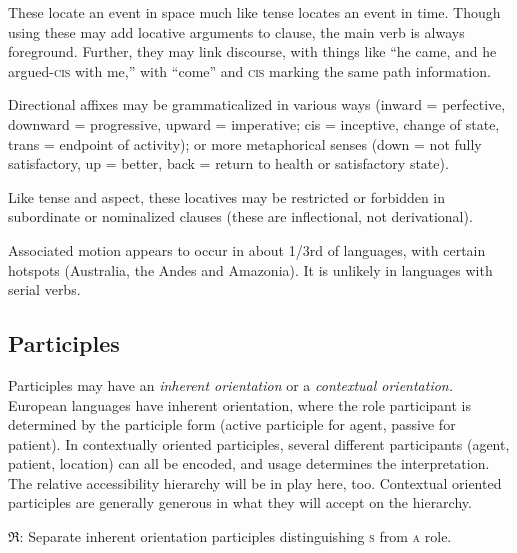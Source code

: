\documentclass[11pt]{article}
\newcommand{\I}[1]{\textsc{#1}}   %
\newcommand{\rara}[1]{$\mathfrak{R}$: #1}
\begin{document}
These locate an event in space much like tense locates an event in
time.  Though using these may add locative arguments to clause, the
main verb is always foreground.  Further, they may link discourse,
with things like ``he came, and he argued-\I{cis} with me,'' with
``come'' and \I{cis} marking the same path information.

Directional affixes may be grammaticalized in various ways (inward =
perfective, downward = progressive, upward = imperative; cis =
inceptive, change of state, trans = endpoint of activity); or more
metaphorical senses (down = not fully satisfactory, up = better, back
= return to health or satisfactory state).

Like tense and aspect, these locatives may be restricted or forbidden
in subordinate or nominalized clauses (these are inflectional, not
derivational). 

Associated motion appears to occur in about 1/3rd of languages, with
certain hotspots (Australia, the Andes and Amazonia).  It is unlikely
in languages with serial verbs.


\subsection{Participles}
Participles may have an \textit{inherent orientation} or a
\textit{contextual orientation.}  European languages have inherent
orientation, where the role participant is determined by the
participle form (active participle for agent, passive for patient).
In contextually oriented participles, several different participants
(agent, patient, location) can all be encoded, and usage determines
the interpretation.  The relative accessibility hierarchy will be in
play here, too.  Contextual oriented participles are generally
generous in what they will accept on the hierarchy.

\rara{Separate inherent orientation participles distinguishing \I{s}
from \I{a} role.}
\end{document}
